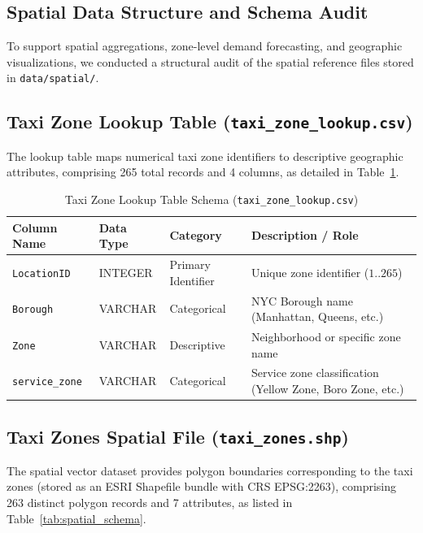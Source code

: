 \documentclass[11pt,a4paper]{article}
\begin{document}
\subsection{Spatial Data Structure and Schema Audit}
To support spatial aggregations, zone-level demand forecasting, and geographic visualizations, we conducted a structural audit of the spatial reference files stored in \texttt{data/spatial/}.

\subsection{Taxi Zone Lookup Table (\texttt{taxi\_zone\_lookup.csv})}
The lookup table maps numerical taxi zone identifiers to descriptive geographic attributes, comprising 265 total records and 4 columns, as detailed in Table~\ref{tab:lookup_schema}.

\begin{table}[htbp]
\centering
\caption{Taxi Zone Lookup Table Schema (\texttt{taxi\_zone\_lookup.csv})}
\label{tab:lookup_schema}
\small
\begin{tabularx}{\textwidth}{llXX}
\toprule
\textbf{Column Name} & \textbf{Data Type} & \textbf{Category} & \textbf{Description / Role} \\
\midrule
\texttt{LocationID} & INTEGER & Primary Identifier & Unique zone identifier ($1..265$) \\
\texttt{Borough} & VARCHAR & Categorical & NYC Borough name (Manhattan, Queens, etc.) \\
\texttt{Zone} & VARCHAR & Descriptive & Neighborhood or specific zone name \\
\texttt{service\_zone} & VARCHAR & Categorical & Service zone classification (Yellow Zone, Boro Zone, etc.) \\
\bottomrule
\end{tabularx}
\end{table}

\subsection{Taxi Zones Spatial File (\texttt{taxi\_zones.shp})}
The spatial vector dataset provides polygon boundaries corresponding to the taxi zones (stored as an ESRI Shapefile bundle with CRS EPSG:2263), comprising 263 distinct polygon records and 7 attributes, as listed in Table~\ref{tab:spatial_schema}.
\end{document}
